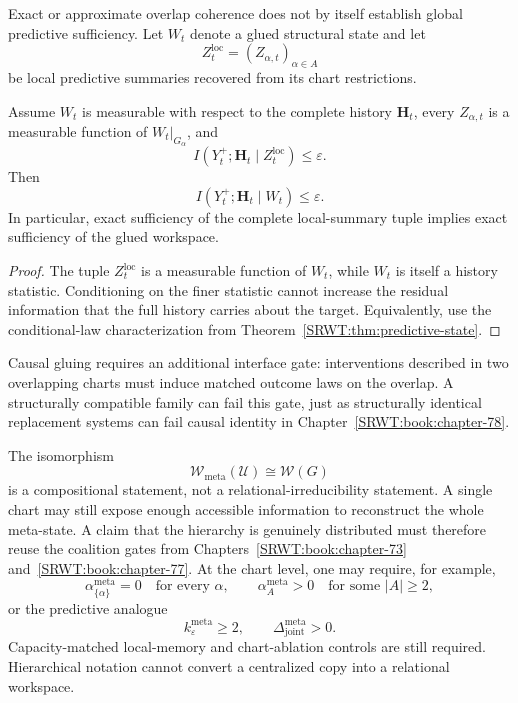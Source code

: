 
Exact or approximate overlap coherence does not by itself establish global
predictive sufficiency. Let \(W_t\) denote a glued structural state and let
\[
Z_t^{\mathrm{loc}}
=
(Z_{\alpha,t})_{\alpha\in A}
\]
be local predictive summaries recovered from its chart restrictions.

\begin{SRWTproposition}\label{SRWT:prop:local-global-predictive}
Assume \(W_t\) is measurable with respect to the complete history
\(\mathbf H_t\), every \(Z_{\alpha,t}\) is a measurable function of
\(W_t|_{G_\alpha}\), and
\[
I(Y_t^+;\mathbf H_t\mid Z_t^{\mathrm{loc}})
\leq
\varepsilon.
\]
Then
\[
\boxed{
I(Y_t^+;\mathbf H_t\mid W_t)
\leq
\varepsilon.
}
\]
In particular, exact sufficiency of the complete local-summary tuple implies
exact sufficiency of the glued workspace.
\end{SRWTproposition}

\begin{proof}
The tuple \(Z_t^{\mathrm{loc}}\) is a measurable function of \(W_t\), while
\(W_t\) is itself a history statistic. Conditioning on the finer statistic
cannot increase the residual information that the full history carries about
the target. Equivalently, use the conditional-law characterization from
Theorem~\ref{SRWT:thm:predictive-state}.
\end{proof}

Causal gluing requires an additional interface gate: interventions described
in two overlapping charts must induce matched outcome laws on the overlap. A
structurally compatible family can fail this gate, just as structurally
identical replacement systems can fail causal identity in Chapter~\ref{SRWT:book:chapter-78}.


The isomorphism
\[
\mathscr W_{\mathrm{meta}}(\mathcal U)\cong\mathscr W(G)
\]
is a compositional statement, not a relational-irreducibility statement. A
single chart may still expose enough accessible information to reconstruct the
whole meta-state. A claim that the hierarchy is genuinely distributed must
therefore reuse the coalition gates from Chapters~\ref{SRWT:book:chapter-73} and~\ref{SRWT:book:chapter-77}. At the chart level,
one may require, for example,
\[
\alpha_{\{\alpha\}}^{\mathrm{meta}}=0
\quad\text{for every }\alpha,
\qquad
\alpha_A^{\mathrm{meta}}>0
\quad\text{for some }|A|\geq2,
\]
or the predictive analogue
\[
k_\varepsilon^{\mathrm{meta}}\geq2,
\qquad
\Delta_{\mathrm{joint}}^{\mathrm{meta}}>0.
\]
Capacity-matched local-memory and chart-ablation controls are still required.
Hierarchical notation cannot convert a centralized copy into a relational
workspace.


